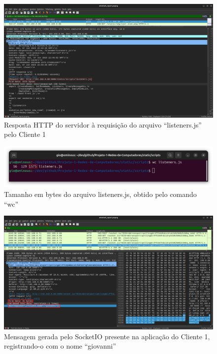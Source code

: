 \documentclass[conference,compsoc]{IEEEtran}
\begin{document}
\begin{otherlanguage}{brazil}
\begin{figure}[!h]
\centering
\includegraphics[width=\columnwidth]{../media/02-OK_listeners.js_file_data.png}
\caption{Resposta HTTP do servidor à requisição do arquivo ``listeners.js'' pelo Cliente 1}
\label{fig:listeners_response}
\end{figure}

\begin{figure}[!h]
\centering
\includegraphics[width=\columnwidth]{../media/03-listeners_total_bytes.png}
\caption{Tamanho em bytes do arquivo listeners.js, obtido pelo comando ``wc''}
\label{fig:listeners_size}
\end{figure}

\begin{figure}[!h]
\centering
\includegraphics[width=\columnwidth]{../media/04-register.png}
\caption{Mensagem gerada pelo SocketIO presente na aplicação do Cliente 1, registrando-o com o nome ``giovanni''}
\label{fig:socketio_register}
\end{figure}


\end{otherlanguage}
\end{document}
